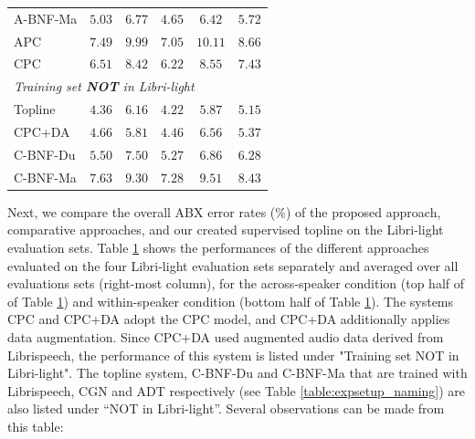 \documentclass[transmag]{IEEEtran}
\begin{document}
\begin{table}[!t]
{\begin{tabular}{l|cccc|c}
A-BNF-Ma & $5.03$&$6.77$&$4.65$&$6.42$&$5.72$\\
APC & $7.49$&$9.99$&$7.05$&$10.11$&$8.66$\\
CPC \cite{kahn2019librilight} & $6.51$&$8.42$&$6.22$&$8.55$&$7.43$\\
\midrule
\multicolumn{6}{l}{\textit{Training set \textbf{NOT} in Libri-light}}\\
Topline & $4.36$&$6.16$&$4.22$&$5.87$&$5.15$\\
CPC+DA \cite{Kharitonov2020data_augment} & $4.66$&$5.81$&$4.46$&$6.56$&$5.37$\\
C-BNF-Du & $5.50$&$7.50$&$5.27$&$6.86$&$6.28$\\
C-BNF-Ma & $7.63$&$9.30$&$7.28$&$9.51$&$8.43$\\
\midrule[0.2pt]
\bottomrule
\end{tabular}%
% 
}
\label{tab:exp_results_dnn_bnf}
\end{table}
Next, we compare the overall ABX error rates ($\%$) of the proposed approach, comparative approaches, and our created supervised topline on the Libri-light evaluation sets.  Table \ref{tab:exp_results_dnn_bnf} shows the performances of the different approaches evaluated on the four Libri-light evaluation sets separately and averaged over all evaluations sets (right-most column), for the across-speaker condition (top half of of Table \ref{tab:exp_results_dnn_bnf}) and within-speaker condition (bottom half of Table \ref{tab:exp_results_dnn_bnf}). 
The systems CPC \cite{kahn2019librilight} and   CPC+DA \cite{Kharitonov2020data_augment} adopt the CPC model, and CPC+DA additionally applies data augmentation. 
Since CPC+DA \cite{Kharitonov2020data_augment} used  augmented audio data derived from Librispeech, the performance of this system is listed under "Training set NOT in Libri-light".
The topline system,  C-BNF-Du and C-BNF-Ma that are trained with Librispeech, CGN and ADT respectively (see Table \ref{table:expsetup_naming}) are also listed under “NOT in Libri-light”.
Several observations can be made from this table:
\end{document}
